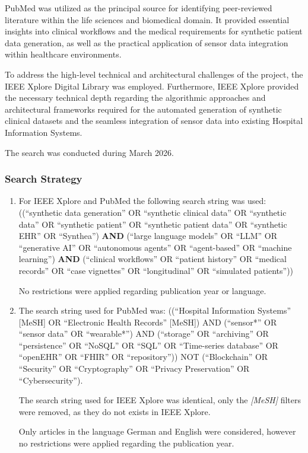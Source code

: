 PubMed was utilized as the principal source for identifying peer-reviewed literature within the life sciences and biomedical domain. It provided essential insights into clinical workflows and the medical requirements for synthetic patient data generation, as well as the practical application of sensor data integration within healthcare environments.

To address the high-level technical and architectural challenges of the project, the IEEE Xplore Digital Library was employed. Furthermore, IEEE Xplore provided the necessary technical depth regarding the algorithmic approaches and architectural frameworks required for the automated generation of synthetic clinical datasets and the seamless integration of sensor data into existing Hospital Information Systems.

The search was conducted during March 2026.

\subsubsection*{Search Strategy}
\begin{enumerate}
    \item For IEEE Xplore and PubMed the following search string was used: ((\enquote{synthetic data generation} OR \enquote{synthetic clinical data} OR \enquote{synthetic data} OR \enquote{synthetic patient} OR \enquote{synthetic patient data} OR \enquote{synthetic EHR} OR \enquote{Synthea})
    \textbf{AND}
    (\enquote{large language models} OR \enquote{LLM} OR \enquote{generative AI} OR \enquote{autonomous agents} OR \enquote{agent-based} OR \enquote{machine learning})
    \textbf{AND}
    (\enquote{clinical workflows} OR \enquote{patient history} OR \enquote{medical records} OR \enquote{case vignettes} OR \enquote{longitudinal} OR \enquote{simulated patients}))
    
    No restrictions were applied regarding publication year or language.
    
    \item The search string used for PubMed was: ((\enquote{Hospital Information Systems} [MeSH] OR \enquote{Electronic Health Records} [MeSH]) 
    AND (\enquote{sensor*} OR \enquote{sensor data} OR \enquote{wearable*}) 
    AND (\enquote{storage} OR \enquote{archiving} OR \enquote{persistence} OR \enquote{NoSQL} OR \enquote{SQL} OR \enquote{Time-series database} OR \\\enquote{openEHR} OR \enquote{FHIR} OR \enquote{repository})) 
    NOT (\enquote{Blockchain} OR \enquote{Security} OR \enquote{Cryptography} OR \enquote{Privacy Preservation} OR \enquote{Cybersecurity}).
    
    The search string used for IEEE Xplore was identical, only the \textit{[MeSH]} filters were removed, as they do not exists in IEEE Xplore.
    
    Only articles in the language German and English were considered, however no restrictions were applied regarding the publication year.
\end{enumerate}
